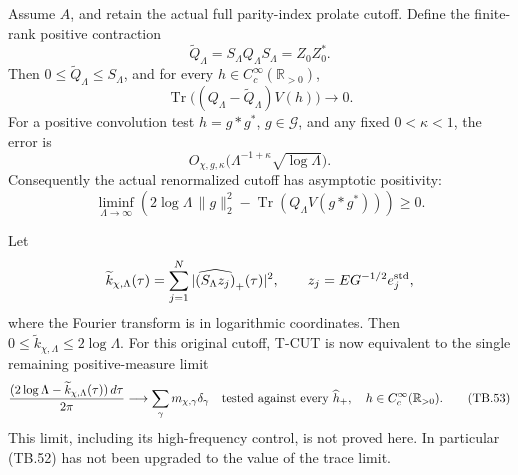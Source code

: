 \begin{theorem}
\label{AC-T30}
Assume \(A\), and retain the actual full parity-index
prolate cutoff.  Define the finite-rank positive contraction
\[
       \widetilde Q_\Lambda=S_\Lambda Q_\Lambda S_\Lambda
              =Z_0Z_0^* .
\]
Then \(0\leq\widetilde Q_\Lambda\leq S_\Lambda\), and for
every \(h\in C_c^\infty(\mathbb R_{>0})\),
\[
 \operatorname{Tr}\bigl((Q_\Lambda-\widetilde Q_\Lambda)V(h)\bigr)
                         \longrightarrow0.
 \tag{TB.50}
\]
For a positive convolution test \(h=g*g^*\), \(g\in\mathscr G\),
and any fixed \(0<\kappa<1\), the error is
\[
 O_{\chi,g,\kappa}
       \bigl(\Lambda^{-1+\kappa}\sqrt{\log\Lambda}\bigr).
 \tag{TB.51}
\]
Consequently the actual renormalized cutoff has asymptotic
positivity:
\[
 \liminf_{\Lambda\to\infty}
 \left(2\log\Lambda\,\|g\|_2^2
       -\operatorname{Tr}(Q_\Lambda V(g*g^*))\right)\geq0.
 \tag{TB.52}
\]

Let
\[
 \widetilde k_{\chi,\Lambda}(\tau)
       =\sum_{j=1}^N|\widehat{(S_\Lambda z_j)}_+(\tau)|^2,
 \qquad z_j=EG^{-1/2}e_j^{\rm std},
\]
where the Fourier transform is in logarithmic coordinates.
Then \(0\leq\widetilde k_{\chi,\Lambda}\leq2\log\Lambda\).
For this original cutoff, T-CUT is now equivalent to the
single remaining positive-measure limit
\[
 \frac{(2\log\Lambda-\widetilde k_{\chi,\Lambda}(\tau))\,d\tau}{2\pi}
     \longrightarrow\sum_\gamma m_{\chi,\gamma}\delta_\gamma
 \quad\hbox{tested against every }\widehat h_+,\quad
                    h\in C_c^\infty(\mathbb R_{>0}).
 \tag{TB.53}
\]
This limit, including its high-frequency control, is not
proved here.  In particular (TB.52) has not been upgraded
to the value of the trace limit.
\end{theorem}
